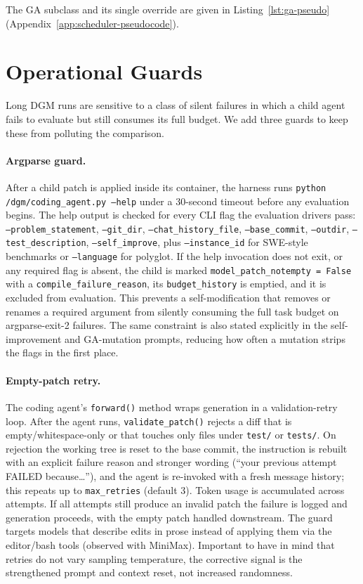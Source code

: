 The GA subclass and its single override are given in
Listing~\ref{lst:ga-pseudo}
(Appendix~\ref{app:scheduler-pseudocode}).

\section{Operational Guards}
\label{sec:guards}

Long DGM runs are sensitive to a class of silent failures in which a
child agent fails to evaluate but still consumes its full budget. We add
three guards to keep these from polluting the comparison.

\paragraph{Argparse guard.}
After a child patch is applied inside its container, the harness runs
\texttt{python /dgm/coding\_agent.py --help} under a 30-second timeout
before any evaluation begins. The help output is checked for every CLI
flag the evaluation drivers pass: \texttt{--problem\_statement},
\texttt{--git\_dir}, \texttt{--chat\_history\_file},
\texttt{--base\_commit}, \texttt{--outdir}, \texttt{--test\_description},
\texttt{--self\_improve}, plus \texttt{--instance\_id} for SWE-style
benchmarks or \texttt{--language} for polyglot. If the help invocation
does not exit, or any required flag is absent, the child is marked
\texttt{model\_patch\_notempty = False} with a
\texttt{compile\_failure\_reason}, its \texttt{budget\_history} is
emptied, and it is excluded from evaluation. This prevents a
self-modification that removes or renames a required argument from
silently consuming the full task budget on argparse-exit-2 failures. The
same constraint is also stated explicitly in the self-improvement and
GA-mutation prompts, reducing how often a mutation strips the flags in
the first place.

\paragraph{Empty-patch retry.}
The coding agent's \texttt{forward()} method wraps generation in a
validation-retry loop. After the agent runs, \texttt{validate\_patch()}
rejects a diff that is empty/whitespace-only or that touches only files
under \texttt{test/} or \texttt{tests/}. On rejection the working tree is
reset to the base commit, the instruction is rebuilt with an explicit
failure reason and stronger wording (``your previous attempt FAILED
because\ldots''), and the agent is re-invoked with a fresh message
history; this repeats up to \texttt{max\_retries} (default 3). Token
usage is accumulated across attempts. If all attempts still produce an
invalid patch the failure is logged and generation proceeds, with the
empty patch handled downstream. The guard targets models that describe
edits in prose instead of applying them via the editor/bash tools
(observed with MiniMax). Important to have in mind that retries do not
vary sampling temperature, the corrective signal is the strengthened
prompt and context reset, not increased randomness.

